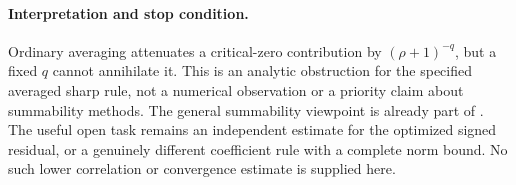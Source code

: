 \paragraph{Interpretation and stop condition.}
Ordinary averaging attenuates a critical-zero contribution by
$(\rho+1)^{-q}$, but a fixed $q$ cannot annihilate it. This is an
analytic obstruction for the specified averaged sharp rule, not a
numerical observation or a priority claim about summability methods.
The general summability viewpoint is already part of
\cite[Section 3]{BaezDuarteStrong}. The useful open task remains an
independent estimate for the optimized signed residual, or a genuinely
different coefficient rule with a complete norm bound. No such lower
correlation or convergence estimate is supplied here.
